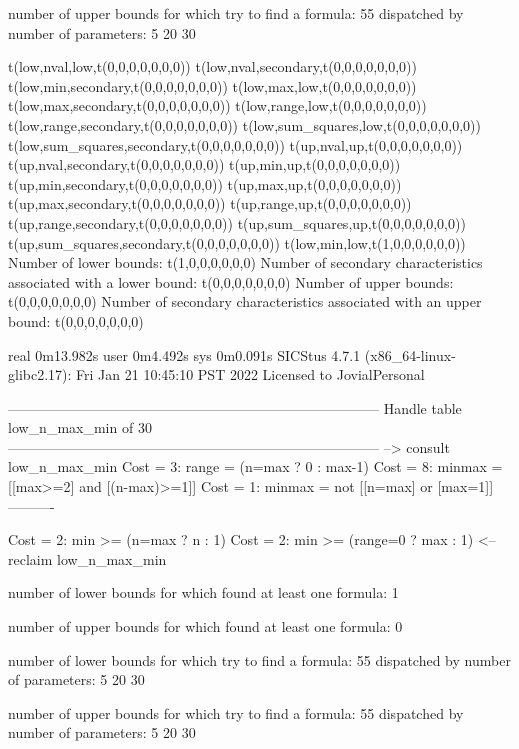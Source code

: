 number of upper bounds for which try to find a formula: 55
dispatched by number of parameters: 5  20  30

t(low,nval,low,t(0,0,0,0,0,0,0))
t(low,nval,secondary,t(0,0,0,0,0,0,0))
t(low,min,secondary,t(0,0,0,0,0,0,0))
t(low,max,low,t(0,0,0,0,0,0,0))
t(low,max,secondary,t(0,0,0,0,0,0,0))
t(low,range,low,t(0,0,0,0,0,0,0))
t(low,range,secondary,t(0,0,0,0,0,0,0))
t(low,sum_squares,low,t(0,0,0,0,0,0,0))
t(low,sum_squares,secondary,t(0,0,0,0,0,0,0))
t(up,nval,up,t(0,0,0,0,0,0,0))
t(up,nval,secondary,t(0,0,0,0,0,0,0))
t(up,min,up,t(0,0,0,0,0,0,0))
t(up,min,secondary,t(0,0,0,0,0,0,0))
t(up,max,up,t(0,0,0,0,0,0,0))
t(up,max,secondary,t(0,0,0,0,0,0,0))
t(up,range,up,t(0,0,0,0,0,0,0))
t(up,range,secondary,t(0,0,0,0,0,0,0))
t(up,sum_squares,up,t(0,0,0,0,0,0,0))
t(up,sum_squares,secondary,t(0,0,0,0,0,0,0))
t(low,min,low,t(1,0,0,0,0,0,0))
Number of lower bounds:                                             t(1,0,0,0,0,0,0)
Number of secondary characteristics associated with a lower bound:  t(0,0,0,0,0,0,0)
Number of upper bounds:                                             t(0,0,0,0,0,0,0)
Number of secondary characteristics associated with an upper bound: t(0,0,0,0,0,0,0)

real	0m13.982s
user	0m4.492s
sys	0m0.091s
SICStus 4.7.1 (x86_64-linux-glibc2.17): Fri Jan 21 10:45:10 PST 2022
Licensed to JovialPersonal


--------------------------------------------------------------------------------
Handle table low_n_max_min of 30
--------------------------------------------------------------------------------
--> consult low_n_max_min
Cost =  3:  range  = (n=max ? 0 : max-1)
Cost =  8:  minmax = [[max>=2] and [(n-max)>=1]]
Cost =  1:  minmax = not [[n=max] or [max=1]]
----------

Cost =  2:  min >= (n=max ? n : 1)
Cost =  2:  min >= (range=0 ? max : 1)
<-- reclaim low_n_max_min

number of lower bounds for which found at least one formula: 1

number of upper bounds for which found at least one formula: 0

number of lower bounds for which try to find a formula: 55
dispatched by number of parameters: 5  20  30

number of upper bounds for which try to find a formula: 55
dispatched by number of parameters: 5  20  30

